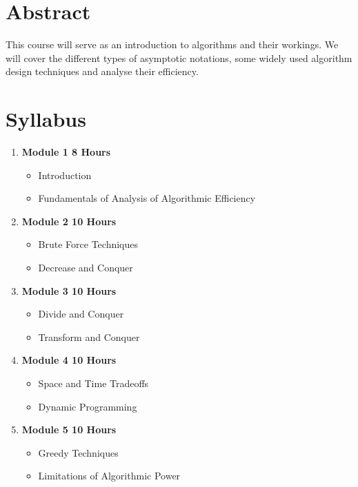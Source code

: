 
\section*{Abstract}
This course will serve as an introduction to algorithms and their workings. We will cover the different types of asymptotic notations, some widely used algorithm design techniques and analyse their efficiency.

\section*{Syllabus}

\begin{enumerate}
    \item \textbf{Module 1 \hfill{} 8 Hours}
    \begin{itemize} [label=]
        \item Introduction
        \item Fundamentals of Analysis of Algorithmic Efficiency
    \end{itemize}
    
    \item \textbf{Module 2 \hfill{} 10 Hours}
    \begin{itemize}[label=]
        \item Brute Force Techniques
        \item Decrease and Conquer
    \end{itemize}

    \item \textbf{Module 3 \hfill{} 10 Hours}
    \begin{itemize}[label=]
        \item Divide and Conquer
        \item Transform and Conquer
    \end{itemize}

    \item \textbf{Module 4\hfill{} 10 Hours}
    \begin{itemize}[label=]
        \item Space and Time Tradeoffs
        \item Dynamic Programming
    \end{itemize}

    
    \item \textbf{Module 5 \hfill{} 10 Hours}
    \begin{itemize}[label=]
        \item Greedy Techniques
        \item Limitations of Algorithmic Power
    \end{itemize}


\end{enumerate}

